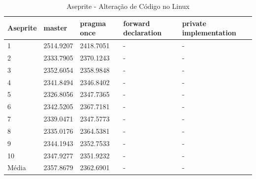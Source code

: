 \begin{table}[!h]
\tiny
\centering
\caption{Aseprite - Alteração de Código no Linux }
\label{tab:alteracao_de_codigo:linux:aseprite}
\begin{tabular}{lllll}
\textbf{Aseprite} & \textbf{master} & \textbf{pragma once} & \textbf{forward declaration} & \textbf{private implementation}   \\ \toprule
1                      &    2514.9207         &  2418.7051   &  -   &  -   \\ 
2                      &    2333.7905         &  2370.1243   &  -   &  -   \\ 
3                      &    2352.6054         &  2358.9848   &  -   &  -   \\ 
4                      &    2341.8494         &  2346.8402   &  -   &  -   \\ 
5                      &    2326.8056         &  2347.7365   &  -   &  -   \\ 
6                      &    2342.5205         &  2367.7181   &  -   &  -   \\ 
7                      &    2339.0471         &  2347.5773   &  -   &  -   \\ 
8                      &    2335.0176         &  2364.5381   &  -   &  -   \\ 
9                      &    2344.1943         &  2352.7533   &  -   &  -   \\ 
10                     &    2347.9277         &  2351.9232   &  -   &  -   \\ \bottomrule
Média                  &    2357.8679         &  2362.6901   &  -   &  -   \\ 
\end{tabular}
\end{table}

